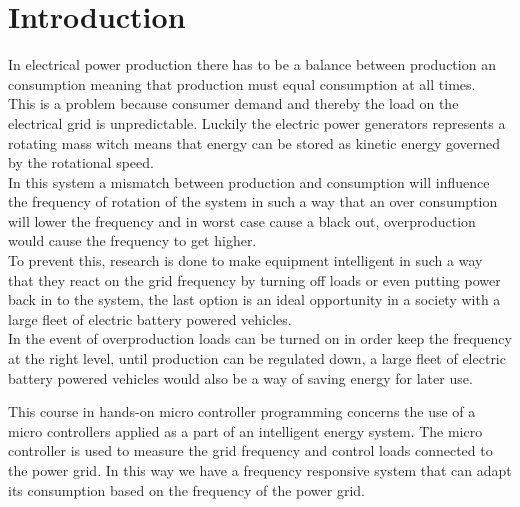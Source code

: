 \chapter{Introduction}
\label{chap:intro}
In electrical power production there has to be a balance between production an consumption meaning that production must equal consumption at all times.\\ This is a problem because consumer demand and thereby the load on the electrical grid is unpredictable. Luckily the electric power generators represents a rotating mass witch means that energy can be stored as kinetic energy governed by the rotational speed.\\ In this system a mismatch between production and consumption will influence the frequency of rotation of the system in such a way that an over consumption will lower the frequency and in worst case cause a black out, overproduction would cause the frequency to get higher.\\ To prevent this, research is done to make equipment intelligent in such a way that they react on the grid frequency by turning off loads or even putting power back in to the system, the last option is an ideal opportunity in a society with a large fleet of electric battery powered vehicles.\\ In the event of overproduction loads can be turned on in order keep the frequency at the right level, until production can be regulated down, a large fleet of electric battery powered vehicles would also be a way of saving energy for later use.

This course in hands-on micro controller programming concerns the use of a micro controllers applied as a part of an intelligent energy system. The micro controller is used to measure the grid frequency and control loads connected to the power grid. In this way we have a frequency responsive system that can adapt its consumption based on the frequency of the power grid.

